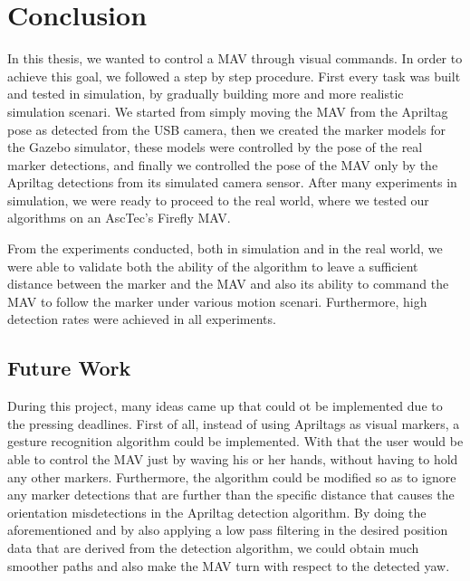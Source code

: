 \chapter{Conclusion}
\label{sec:cocnlusion}

In this thesis, we wanted to control a MAV through visual commands. In order to achieve this goal, we followed a step by step procedure. First every task was built and tested in simulation, by gradually building more and more realistic simulation scenari. We started from simply moving the MAV from the Apriltag pose as detected from the USB camera, then we created the marker models for the Gazebo simulator, these models were controlled by the pose of the real marker detections, and finally we controlled the pose of the MAV only by the Apriltag detections from its simulated camera sensor. After many experiments in simulation, we were ready to proceed to the real world, where we tested our algorithms on an AscTec's Firefly MAV. 

From the experiments conducted, both in simulation and in the real world, we were able to validate both the ability of the algorithm to leave a sufficient distance between the marker and the MAV and also its ability to command the MAV to follow the marker under various motion scenari. Furthermore, high detection rates were achieved in all experiments.


\section{Future Work}
\label{sec:futureWork}

During this project, many ideas came up that could ot be implemented due to the pressing deadlines. First of all, instead of using Apriltags as visual markers, a gesture recognition algorithm could be implemented. With that the user would be able to control the MAV just by waving his or her hands, without having to hold any other markers. Furthermore, the algorithm could be modified so as to ignore any marker detections that are further than the specific distance that causes the orientation misdetections in the Apriltag detection algorithm. By doing the aforementioned and by also applying a low pass filtering in the desired position data that are derived from the detection algorithm, we could obtain much smoother paths and also make the MAV turn with respect to the detected yaw.